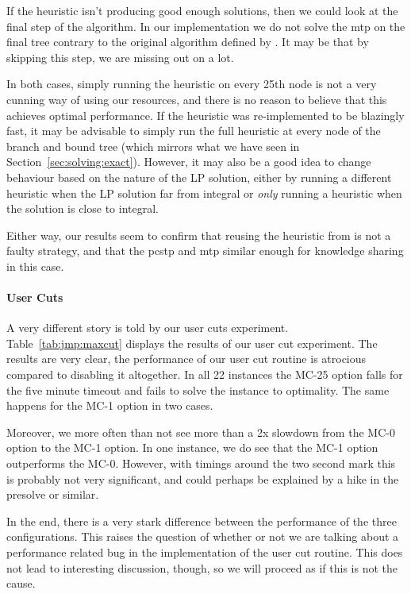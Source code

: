 If the heuristic isn't producing good enough solutions, then we could look at the final step
of the algorithm. In our implementation we do not solve the \gls{mtp} on the final tree contrary
to the original algorithm defined by \citet{ljubic2005solving}. It may be that by skipping
this step, we are missing out on a lot.

In both cases, simply running the heuristic on every 25th node is not a very cunning
way of using our resources, and there is no reason to believe that this achieves optimal
performance.
If the heuristic was re-implemented to be blazingly fast, it may be advisable to
simply run the full heuristic at every node of the branch and bound tree
(which mirrors what we have seen in Section~\ref{sec:solving:exact}). However, it may also
be a good idea to change behaviour based on the nature of the LP solution, either by
running a different heuristic when the LP solution far from integral or \textit{only}
running a heuristic when the solution is close to integral.

Either way, our results seem to confirm that reusing the heuristic from
\citeauthor{ljubic2005solving} is not a faulty strategy, and that the \gls{pcstp}
and \gls{mtp} similar enough for knowledge sharing in this case.

\paragraph{User Cuts}
A very different story is told by our user cuts experiment. Table~\ref{tab:jmp:maxcut}
displays the results of our user cut experiment. The results are very clear, the performance
of our user cut routine is atrocious compared to disabling it altogether. In all 22 instances
the MC-25 option falls for the five minute timeout and fails to solve the instance to optimality.
The same happens for the MC-1 option in two cases.

Moreover, we more often than not see more than a 2x slowdown from the MC-0 option to the
MC-1 option. In one instance, we do see that the MC-1 option outperforms the MC-0.
However, with
timings around the two second mark this is probably not very significant, and could
perhaps be explained by a hike in the presolve or similar.
\medskip

In the end, there is a very stark difference between the performance
 of the three configurations.
This raises the question of whether or not we are talking about a performance
related bug in the implementation of the user cut routine. This does not lead to
interesting discussion, though, so we will proceed as if this is not the cause.

